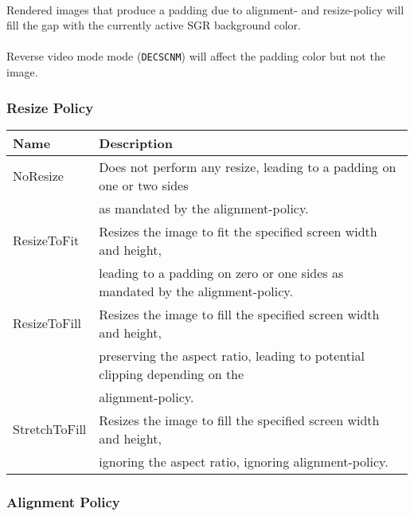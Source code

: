 \documentclass[a4paper]{article}
\newcommand{\code}[1]{\colorbox{light-gray}{\texttt{#1}}}
\begin{document}
\paragraph*{}
Rendered images that produce a padding due to alignment- and resize-policy will fill the gap with the
currently active SGR background color.

\paragraph*{}
Reverse video mode mode (\code{DECSCNM}) will affect the padding color but not the image.

\subsubsection*{Resize Policy}

\begin{tabular}{ |l|l| }
    \hline
    \textbf{Name}          & \textbf{Description} \\
    \hline
    NoResize      & Does not perform any resize, leading to a padding on one or two sides \\
                  & as mandated by the alignment-policy. \\
    ResizeToFit   & Resizes the image to fit the specified screen width and height, \\
                  & leading to a padding on zero or one sides as mandated by the alignment-policy. \\
    ResizeToFill  & Resizes the image to fill the specified screen width and height, \\
                  & preserving the aspect ratio, leading to potential clipping depending on the \\
                  & alignment-policy. \\
    StretchToFill & Resizes the image to fill the specified screen width and height, \\
                  & ignoring the aspect ratio, ignoring alignment-policy. \\
    \hline
\end{tabular}

\subsubsection*{Alignment Policy}
\end{document}
